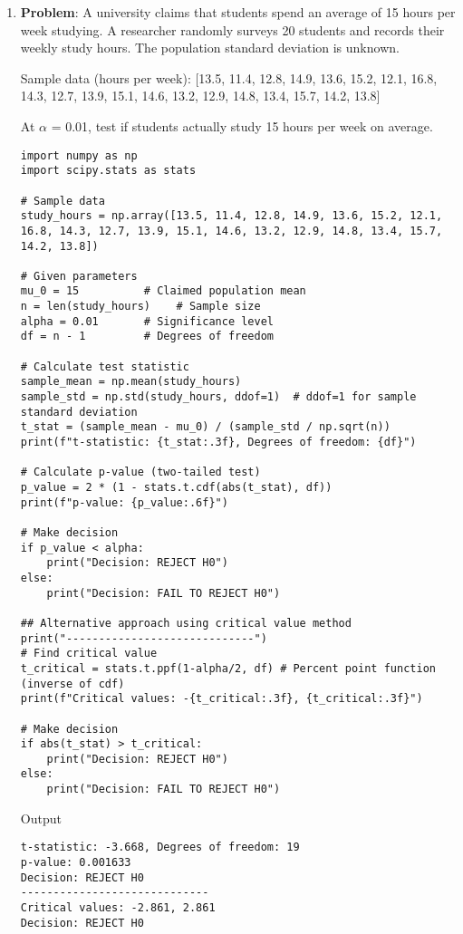 \begin{enumerate}
    \item \textbf{Problem}: A university claims that students spend an average of 15 hours per week studying. A researcher randomly surveys 20 students and records their weekly study hours. The population standard deviation is unknown.

    Sample data (hours per week): [13.5, 11.4, 12.8, 14.9, 13.6, 15.2, 12.1, 16.8, 14.3, 12.7, 13.9, 15.1, 14.6, 13.2, 12.9, 14.8, 13.4, 15.7, 14.2, 13.8]

    At $\alpha$ = 0.01, test if students actually study 15 hours per week on average.

    \begin{lstlisting}
import numpy as np
import scipy.stats as stats

# Sample data
study_hours = np.array([13.5, 11.4, 12.8, 14.9, 13.6, 15.2, 12.1, 16.8, 14.3, 12.7, 13.9, 15.1, 14.6, 13.2, 12.9, 14.8, 13.4, 15.7, 14.2, 13.8])

# Given parameters
mu_0 = 15          # Claimed population mean
n = len(study_hours)    # Sample size
alpha = 0.01       # Significance level
df = n - 1         # Degrees of freedom

# Calculate test statistic
sample_mean = np.mean(study_hours)
sample_std = np.std(study_hours, ddof=1)  # ddof=1 for sample standard deviation
t_stat = (sample_mean - mu_0) / (sample_std / np.sqrt(n))
print(f"t-statistic: {t_stat:.3f}, Degrees of freedom: {df}")

# Calculate p-value (two-tailed test)
p_value = 2 * (1 - stats.t.cdf(abs(t_stat), df))
print(f"p-value: {p_value:.6f}")

# Make decision
if p_value < alpha:
    print("Decision: REJECT H0")
else:
    print("Decision: FAIL TO REJECT H0")

## Alternative approach using critical value method
print("-----------------------------")
# Find critical value
t_critical = stats.t.ppf(1-alpha/2, df) # Percent point function (inverse of cdf)
print(f"Critical values: -{t_critical:.3f}, {t_critical:.3f}")

# Make decision
if abs(t_stat) > t_critical:
    print("Decision: REJECT H0")
else:
    print("Decision: FAIL TO REJECT H0")
    \end{lstlisting}
    Output
    \begin{lstlisting}
t-statistic: -3.668, Degrees of freedom: 19
p-value: 0.001633
Decision: REJECT H0
-----------------------------
Critical values: -2.861, 2.861
Decision: REJECT H0
    \end{lstlisting}


\end{enumerate}











